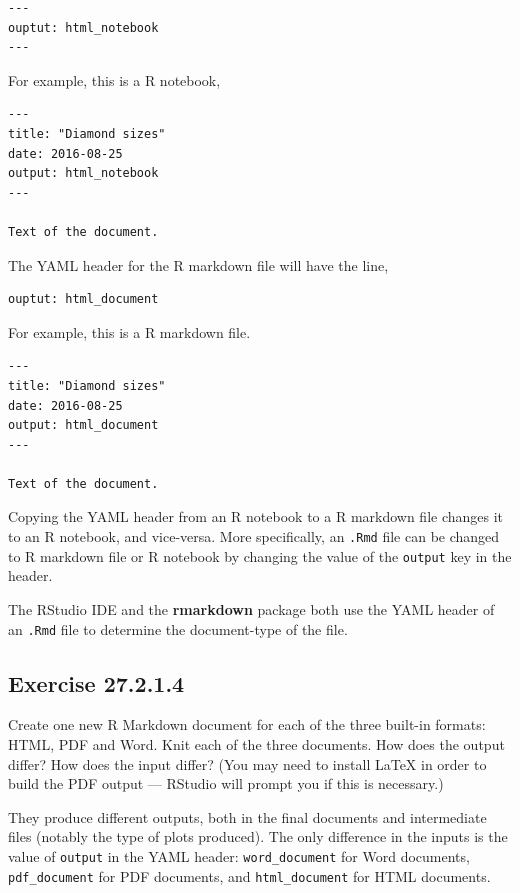 \documentclass[]{book}
\theoremstyle{plain}
\theoremstyle{remark}
\begin{document}
\begin{verbatim}
---
ouptut: html_notebook
---
\end{verbatim}

For example, this is a R notebook,

\begin{verbatim}
---
title: "Diamond sizes"
date: 2016-08-25
output: html_notebook
---

Text of the document.
\end{verbatim}

The YAML header for the R markdown file will have the line,

\begin{verbatim}
ouptut: html_document
\end{verbatim}

For example, this is a R markdown file.

\begin{verbatim}
---
title: "Diamond sizes"
date: 2016-08-25
output: html_document
---

Text of the document.
\end{verbatim}

Copying the YAML header from an R notebook to a R markdown file changes it to an R notebook, and vice-versa.
More specifically, an \texttt{.Rmd} file can be changed to R markdown file or R notebook by changing the value of the \texttt{output} key in the header.

The RStudio IDE and the \textbf{rmarkdown} package both use the YAML header of an \texttt{.Rmd} file to determine the document-type of the file.

\hypertarget{exercise-27.2.1.4}{%
\subsection*{\texorpdfstring{Exercise {27.2.1.4}}{Exercise 27.2.1.4}}\label{exercise-27.2.1.4}}

Create one new R Markdown document for each of the three built-in formats:
HTML, PDF and Word. Knit each of the three documents. How does the output
differ? How does the input differ? (You may need to install LaTeX in order to
build the PDF output --- RStudio will prompt you if this is necessary.)

They produce different outputs, both in the final documents and intermediate
files (notably the type of plots produced). The only difference in the inputs
is the value of \texttt{output} in the YAML header: \texttt{word\_document} for Word
documents, \texttt{pdf\_document} for PDF documents, and \texttt{html\_document} for HTML
documents.
\end{document}
